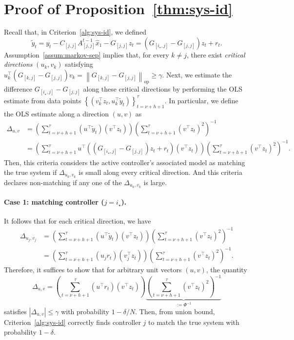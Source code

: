\documentclass[11pt, twoside]{article}
\newcounter{criteria}
\theoremstyle{definition}
\newcommand{\norm}[1]{\left\lVert #1 \right\rVert}
\newcommand{\opnorm}[1]{\norm{#1}_{\mathrm{op}}}
\begin{document}
\section{Proof of Proposition~\ref{thm:sys-id}}
\label{sec:proof-sysid}
Recall that, in Criterion~\ref{alg:sys-id}, we defined 
\[\widetilde{y}_{t} = y_t - C_{[j,j]} A_{[j,j]}^{t-1} \hat{x}_1 - G_{[j,j]} z_t = (G_{[i_\star, j]} - G_{[j, j]}) z_t + r_t.\]
Assumption~\ref{assum:markov-sep} implies that, for every $k \neq j$, there exist \textit{critical directions} $(u_k, v_k)$ satisfying $u_k^\top (G_{[k, j]} - G_{[j, j]}) v_k = \opnorm{G_{[k, j]} - G_{[j, j]}} \ge \gamma$.
Next, we estimate the difference $G_{[i_\star, j]} - G_{[j, j]}$ along these critical directions by performing the OLS estimate from data points $\left\{(v_k^\top z_t, u_k^\top \widetilde{y}_t)\right\}_{t=\nu+h+1}^\tau$.
In particular, we define the OLS estimate along a direction $(u, v)$ as
\begin{align*}
    \Delta_{u, v}
    &= \left(\sum_{t=\nu+h+1}^{\tau} (u^\top \widetilde{y}_t) (v^\top z_t)\right) \left(\sum_{t=\nu+h+1}^{\tau} (v^\top z_t)^2\right)^{-1} \\
    &= \left(\sum_{t=\nu+h+1}^{\tau} u^\top ((G_{[i_\star, j]} - G_{[j, j]})z_t + r_t) (v^\top z_t)\right) \left(\sum_{t=\nu+h+1}^{\tau} (v^\top z_t)^2\right)^{-1}.
\end{align*}
Then, this criteria considers the active controller's associated model as matching the true system if $\Delta_{u_k, v_k}$ is small along every critical direction.
And this criteria declares non-matching if any one of the $\Delta_{u_k, v_k}$ is large.

\paragraph{Case 1: matching controller ($j = i_\star$).}
It follows that for each critical direction, we have
\begin{align*}
    \Delta_{u_j, v_j}
    &= \left(\sum_{t=\nu+h+1}^{\tau} (u^\top \widetilde{y}_t) (v^\top z_t)\right) \left(\sum_{t=\nu+h+1}^{\tau} (v^\top z_t)^2\right)^{-1} \\
    &= \left(\sum_{t=\nu+h+1}^{\tau}  (u_j r_t) (v_j^\top z_t)\right) \left(\sum_{t=\nu+h+1}^{\tau} (v^\top z_t)^2\right)^{-1}.
\end{align*}
Therefore, it suffices to show that for arbitrary unit vectors $(u, v)$, the quantity 
\begin{equation}
\label{equ:ols-uv}
    \Delta_{u, v} = \left(\sum_{t=\nu+h+1}^{\tau} (u^\top r_t)(v^\top z_t)\right) \underbrace{\left(\sum_{t=\nu+h+1}^{\tau} (v^\top z_t)^2 \right)^{-1}}_{:= \Phi^{-1}}
\end{equation}
satisfies $|\Delta_{u,v}| \le \gamma$ with probability $1-\delta/N$.
Then, from union bound, Criterion~\ref{alg:sys-id} correctly finds controller $j$ to match the true system with probability $1-\delta$.
\end{document}
